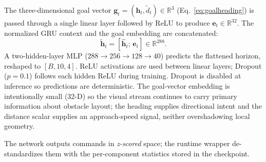 \documentclass[10pt,twocolumn,letterpaper]{article}
\begin{document}
The three-dimensional goal vector $\mathbf{g}_t = (\mathbf{h}_t, \tilde{d}_t) \in \mathbb{R}^3$ (Eq.~\ref{eq:goalheading}) is passed through a single linear layer followed by ReLU to produce $\mathbf{e}_t \in \mathbb{R}^{32}$. The normalized GRU context and the goal embedding are concatenated:
\begin{equation}
\label{eq:concat}
\tilde{\mathbf{h}}_t = [\hat{\mathbf{h}}_t;\, \mathbf{e}_t] \in \mathbb{R}^{288}.
\end{equation}
A two-hidden-layer MLP ($288 \rightarrow 256 \rightarrow 128 \rightarrow 40$) predicts the flattened horizon, reshaped to $[B,10,4]$. ReLU activations are used between linear layers; Dropout ($p{=}0.1$) follows each hidden ReLU during training. Dropout is disabled at inference so predictions are deterministic. The goal-vector embedding is intentionally small (32-D) so the visual stream continues to carry primary information about obstacle layout; the heading supplies directional intent and the distance scalar supplies an approach-speed signal, neither overshadowing local geometry.

The network outputs commands in \emph{z-scored} space; the runtime wrapper de-standardizes them with the per-component statistics stored in the checkpoint.
\end{document}
